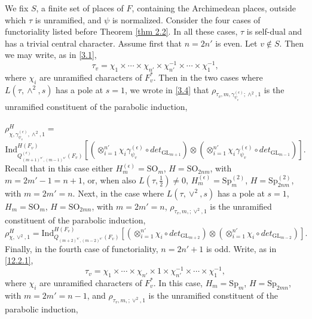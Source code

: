 \documentclass[12pts]{amsart}
\newcommand{\GL}{{\mathrm{GL}}}
\newcommand{\Ind}{{\mathrm{Ind}}}
\newcommand{\SO}{{\mathrm{SO}}}
\newcommand{\Sp}{{\mathrm{Sp}}}
\begin{document}
We fix $S$, a finite set of places of $F$, containing the Archimedean places, outside which $\tau$ is unramified, and $\psi$ is normalized. Consider the four cases of functoriality listed before Theorem \ref{thm 2.2}. In all these cases, $\tau$ is self-dual and has a trivial central character. Assume first that $n=2n'$ is even. Let $v\notin S$. Then we may write, as in \eqref{3.1},
\begin{equation}\label{12.2.1}
\tau_v=\chi_1\times\cdots\times \chi_{n'}\times\chi^{-1}_{n'}\times\cdots\times\chi^{-1}_1,
\end{equation}
where $\chi_i$ are unramified characters of $F_v^*$. Then in the two cases where
$L(\tau, \wedge^2,s)$ has a pole at $s=1$, we wrote in \eqref{3.4} that $\rho_{\tau_v,m, \gamma_{\psi_v}^{(\epsilon)};\wedge^2,1}$ is the unramified constituent of the parabolic induction,\\
\\
$\rho^H_{\chi,\gamma_{\psi_v}^{(\epsilon)},\wedge^2,1}=$ 
\begin{equation}\label{12.3}
\Ind^{H(F_v)}_{Q^{(\epsilon)}_{(m+1)^{n'},(m-1)^{n'}}(F_v)}[(\otimes_{i=1}^{n'}\chi_i\gamma_{\psi_v}^{(\epsilon)}\circ det_{\GL_{m+1}}) \otimes (\otimes_{i=1}^{n'}\chi_i\gamma_{\psi_v}^{(\epsilon)}\circ det_{\GL_{m-1}})].
\end{equation}
Recall that in this case either $H^{(\epsilon)}_m=\SO_m$, $H=\SO_{2nm}$, with $m=2m'-1=n+1$, or, when also $L(\tau,\frac{1}{2})\neq 0$, $H_m^{(\epsilon)}=\Sp_m^{(2)}$, $H=\Sp^{(2)}_{2nm}$, with $m=2m'=n$. Next, in the case where $L(\tau, \vee^2,s)$ has a pole at $s=1$, $H_m=\SO_m$, $H=\SO_{2mn}$, with $m=2m'=n$, $\rho_{\tau_v,m,;\vee^2,1}$ is the unramified constituent of the parabolic induction,
\begin{equation}\label{12.4}
\rho^H_{\chi,\vee^2,1}=\Ind^{H(F_v)}_{Q_{(m+2)^{n'},(m-2)^{n'}}(F_v)}[(\otimes_{i=1}^{n'}\chi_i\circ det_{\GL_{m+2}}) \otimes (\otimes_{i=1}^{n'}\chi_i\circ det_{\GL_{m-2}})].
\end{equation}
Finally, in the fourth case of functoriality, $n=2n'+1$ is odd. Write, as in \eqref{12.2.1},
\begin{equation}\label{12.5}
\tau_v=\chi_1\times\cdots\times \chi_{n'}\times 1\times\chi^{-1}_{n'}\times\cdots\times\chi^{-1}_1,
\end{equation}
where $\chi_i$ are unramified characters of $F_v^*$. In this case, $H_m=\Sp_m$, $H=\Sp_{2mn}$, with $m=2m'=n-1$, and $\rho_{\tau_v,m,;\vee^2,1}$ is the unramified constituent of the parabolic induction, \\
\end{document}

